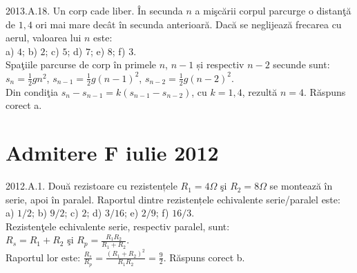 2013.A.18. Un corp cade liber. În secunda $n$ a mişcării corpul parcurge o distanţă de $1,4$ ori mai mare decât în secunda anterioară. Dacă se neglijează frecarea cu aerul, valoarea lui $n$ este:\\ a) $4$; b) $2$; c) $5$; d) $7$; e) $8$; f) $3$.\\ Spaţiile parcurse de corp în primele $n$, $n-1$ și respectiv $n-2$ secunde sunt: $s_{n}=\frac{1}{2} g n^{2}$, $s_{n-1}=\frac{1}{2} g(n-1)^{2}$, $s_{n-2}=\frac{1}{2} g(n-2)^{2}$.\\ Din condiţia $s_{n}-s_{n-1}=k\left(s_{n-1}-s_{n-2}\right)$, cu $k=1,4$, rezultă $n=4$. Răspuns corect a.\\

\section{Admitere F iulie 2012}

2012.A.1. Două rezistoare cu rezistențele $R_{1}=4 \Omega$ şi $R_{2}=8 \Omega$ se montează în serie, apoi în paralel. Raportul dintre rezistențele echivalente serie/paralel este:\\ a) $1 / 2$; b) $9 / 2$; c) $2$; d) $3 / 16$; e) $2 / 9$; f) $16 / 3$.\\ Rezistenţele echivalente serie, respectiv paralel, sunt:\\ $R_{s}=R_{1}+R_{2}$ şi $R_{p}=\frac{R_{1} R_{2}}{R_{1}+R_{2}}$.\\ Raportul lor este: $\frac{R_{s}}{R_{p}}=\frac{\left(R_{1}+R_{2}\right)^{2}}{R_{1} R_{2}}=\frac{9}{2}$. Răspuns corect b.\\

